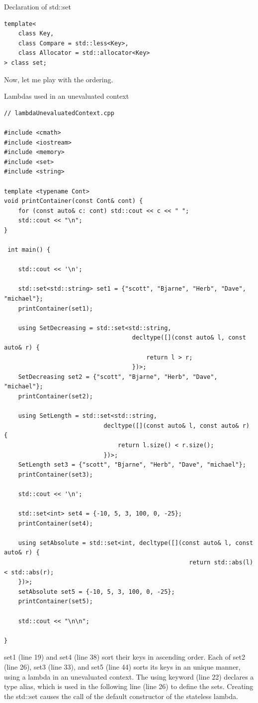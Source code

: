 \noindent
Declaration of std::set
\begin{lstlisting}[style=styleCXX]
template<
	class Key,
	class Compare = std::less<Key>,
	class Allocator = std::allocator<Key>
> class set;
\end{lstlisting}

Now, let me play with the ordering.

\noindent
Lambdas used in an unevaluated context
\begin{lstlisting}[style=styleCXX]
// lambdaUnevaluatedContext.cpp

#include <cmath>
#include <iostream>
#include <memory>
#include <set>
#include <string>

template <typename Cont>
void printContainer(const Cont& cont) {
	for (const auto& c: cont) std::cout << c << " ";
	std::cout << "\n";
}

 int main() {
	
	std::cout << '\n';
	
	std::set<std::string> set1 = {"scott", "Bjarne", "Herb", "Dave", "michael"};
	printContainer(set1);
	
	using SetDecreasing = std::set<std::string,
									decltype([](const auto& l, const auto& r) {
	 									return l > r;
									})>;
	SetDecreasing set2 = {"scott", "Bjarne", "Herb", "Dave", "michael"};
	printContainer(set2);
	
	using SetLength = std::set<std::string,
							decltype([](const auto& l, const auto& r) {
	 							return l.size() < r.size();
							})>;
	SetLength set3 = {"scott", "Bjarne", "Herb", "Dave", "michael"};
	printContainer(set3);
	
	std::cout << '\n';
	
	std::set<int> set4 = {-10, 5, 3, 100, 0, -25};
	printContainer(set4);
	
	using setAbsolute = std::set<int, decltype([](const auto& l, const auto& r) {
	 												return std::abs(l)< std::abs(r);
	})>;
	setAbsolute set5 = {-10, 5, 3, 100, 0, -25};
	printContainer(set5);
	
	std::cout << "\n\n";

}
\end{lstlisting}

set1 (line 19) and set4 (line 38) sort their keys in ascending order. Each of set2 (line 26), set3 (line 33), and set5 (line 44) sorts its keys in an unique manner, using a lambda in an unevaluated context. The using keyword (line 22) declares a type alias, which is used in the following line (line 26) to define the sets. Creating the std::set causes the call of the default constructor of the stateless lambda.


